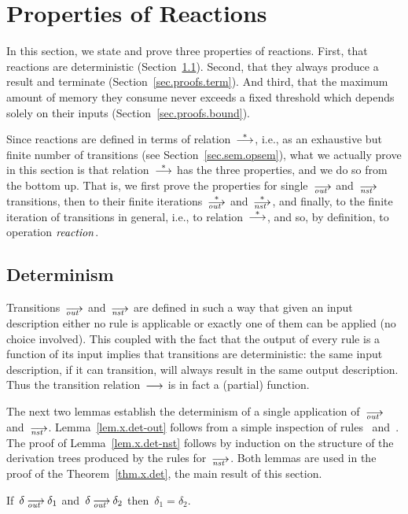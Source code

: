 \section{Properties of \CEU Reactions}
\label{sec.proofs}

In this section, we state and prove three properties of \CEU reactions.
First, that reactions are deterministic (Section~\ref{sec.proofs.det}).
Second, that they always produce a result and terminate
(Section~\ref{sec.proofs.term}). And third, that the maximum amount of
memory they consume never exceeds a fixed threshold which depends solely on
their inputs (Section~\ref{sec.proofs.bound}).

Since reactions are defined in terms of relation~$\trans[*]$, i.e., as an
exhaustive but finite number of transitions (see
Section~\ref{sec.sem.opsem}), what we actually prove in this section is that
relation~$\trans[*]$ has the three properties, and we do so from the bottom
up.  That is, we first prove the properties for single~$\out$ and~$\nst$
transitions, then to their finite iterations~$\out[*]$ and~$\nst[*]$, and
finally, to the finite iteration of transitions in general, i.e., to
relation~$\trans[*]$, and so, by definition, to operation $\mathop{\mathit{reaction}}$.

\subsection{Determinism}
\label{sec.proofs.det}

Transitions~$\out$ and~$\nst$ are defined in such a way that given an input
description either no rule is applicable or exactly one of them can be
applied (no choice involved).  This coupled with the fact that the output of
every rule is a function of its input implies that transitions are
deterministic: the same input description, if it can transition, will always
result in the same output description.  Thus the transition
relation~$\trans$ is in fact a (partial) function.

The next two lemmas establish the determinism of a single application
of~$\out$ and~$\nst$.  Lemma~\ref{lem.x.det-out} follows from a simple
inspection of rules~ and~.  The proof of
Lemma~\ref{lem.x.det-nst} follows by induction on the structure of the
derivation trees produced by the rules for~$\nst$.  Both lemmas are used in
the proof of the Theorem~\ref{thm.x.det}, the main result of this section.

\begin{lemma}[label=lem.x.det-out,restate=lemxdetout]
  If~$\delta\out\delta_1$ and~$\delta\out\delta_2$ then~$\delta_1=\delta_2$.
\end{lemma}

